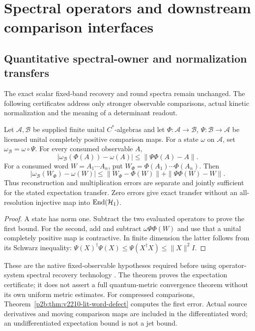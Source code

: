 \documentclass[12pt,a4paper]{article}
\begin{document}
\section{Spectral operators and downstream comparison interfaces}
\label{paper2d:sec:organized-exports}

\subsection{Quantitative spectral-owner and normalization transfers}
\label{p2d:sec:v2210-lit-owner-transfers}
The exact scalar fixed-band recovery and round spectra remain unchanged.
The following certificates address only stronger observable comparisons,
actual kinetic normalization and the meaning of a determinant readout.

\begin{theorem}
\label{p2d:thm:v2210-lit-positive-recovery}
Let $\mathcal A,\mathcal B$ be supplied finite unital $C^*$-algebras and
let $\Phi:\mathcal A\to\mathcal B$, $\Psi:\mathcal B\to\mathcal A$ be
licensed unital completely positive comparison maps.  For a state
$\omega$ on $\mathcal A$, set $\omega_{\mathcal B}=\omega\circ\Psi$.
For every consumed observable $A$,
\[
 |\omega_{\mathcal B}(\Phi(A))-\omega(A)|
 \le\|\Psi\Phi(A)-A\|.
\]
For a consumed word $W=A_1\cdots A_n$, put
$W_\Phi=\Phi(A_1)\cdots\Phi(A_n)$.  Then
\[
 |\omega_{\mathcal B}(W_\Phi)-\omega(W)|
 \le\|W_\Phi-\Phi(W)\|+\|\Psi\Phi(W)-W\|.
\]
Thus reconstruction and multiplication errors are separate and jointly
sufficient for the stated expectation transfer.  Zero errors give exact
transfer without an all-resolution injective map into $\operatorname{End}(\mathcal H_1)$.
\end{theorem}
\begin{proof}
A state has norm one.  Subtract the two evaluated operators to prove the
first bound.  For the second, add and subtract $\omega\Psi\Phi(W)$ and
use that a unital completely positive map is contractive.  In finite
dimension the latter follows from its Schwarz inequality:
$\Psi(X)^\dagger\Psi(X)\le\Psi(X^\dagger X)\le\|X\|^2I$.
\end{proof}
These are the native fixed-observable hypotheses required before using
operator-system spectral recovery technology
\cite{LitGEOVanSuijlekom2020Truncation}.  The theorem proves the expectation
certificate; it does not assert a full quantum-metric convergence theorem
without its own uniform metric estimates.  For compressed comparisons,
Theorem~\ref{p2b:thm:v2210-lit-word-defect} computes the first error.
Actual source derivatives and moving comparison maps are included in the
differentiated word; an undifferentiated expectation bound is not a jet bound.
\end{document}
